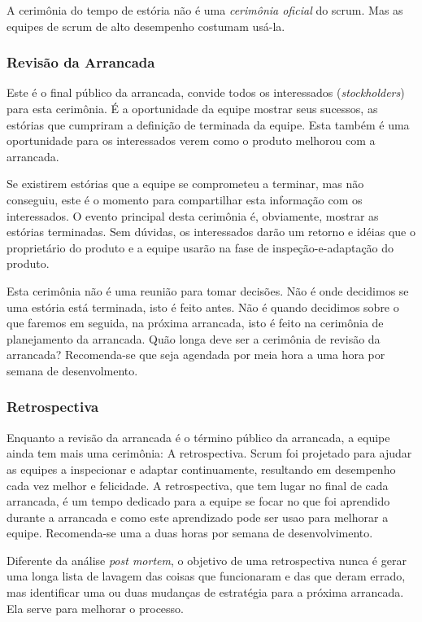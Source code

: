 \documentclass[
	11pt,				%
	openright,
	twoside,			%
	a4paper,			%
	english,			%
	french,
	brazil,				%
	sumario=tradicional
	]{abntex2}
\begin{document}
A cerimônia do tempo de estória não é uma \emph{cerimônia oficial} do scrum. Mas as equipes de scrum de alto desempenho costumam usá-la.

\subsubsection{Revisão da Arrancada}

Este é o final público da arrancada, convide todos os interessados (\textit{stockholders}) para esta cerimônia. É a oportunidade da equipe mostrar seus sucessos, as estórias que cumpriram a definição de terminada da equipe. Esta também é uma oportunidade para os interessados verem como o produto melhorou com a arrancada.

Se existirem estórias que a equipe se comprometeu a terminar, mas não conseguiu, este é o momento para compartilhar esta informação com os interessados. O evento principal desta cerimônia é, obviamente, mostrar as estórias terminadas. Sem dúvidas, os interessados darão um retorno e idéias que o proprietário do produto e a equipe usarão na fase de inspeção-e-adaptação do produto.

Esta cerimônia não é uma reunião para tomar decisões. Não é onde decidimos se uma estória está terminada, isto é feito antes. Não é quando decidimos sobre o que faremos em seguida, na próxima arrancada, isto é feito na cerimônia de planejamento da arrancada.
Quão longa deve ser a cerimônia de revisão da arrancada? Recomenda-se que seja agendada por meia hora a uma hora por semana de desenvolmento.

\subsubsection{Retrospectiva}

Enquanto a revisão da arrancada é o término público da arrancada, a equipe ainda tem mais uma cerimônia: A retrospectiva. Scrum foi projetado para ajudar as equipes a inspecionar e adaptar continuamente, resultando em desempenho cada vez melhor e felicidade. A retrospectiva, que tem lugar no final de cada arrancada, é um tempo dedicado para a equipe se focar no que foi aprendido durante a arrancada e como este aprendizado pode ser usao para melhorar a equipe. Recomenda-se uma a duas horas por semana de desenvolvimento.

Diferente da análise \textit{post mortem}, o objetivo de uma retrospectiva nunca é gerar uma longa lista de lavagem das coisas que funcionaram e das que deram errado, mas identificar uma ou duas mudanças de estratégia para a próxima arrancada. Ela serve para melhorar o processo.
\end{document}

